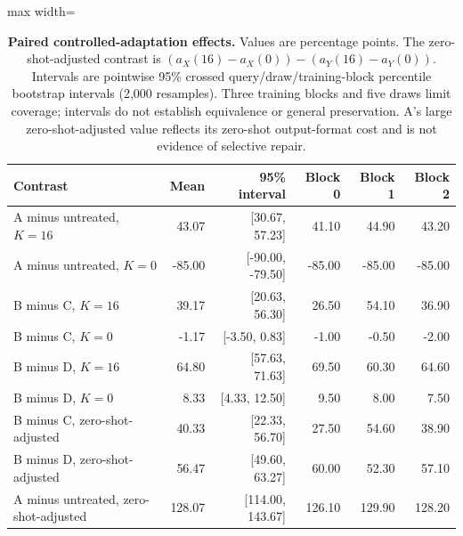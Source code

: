 \begin{table}[p]
\centering\color{blue}
\caption{\textbf{Paired controlled-adaptation effects.} Values are percentage points. The zero-shot-adjusted contrast is $(a_X(16)-a_X(0))-(a_Y(16)-a_Y(0))$. Intervals are pointwise 95\% crossed query/draw/training-block percentile bootstrap intervals (2,000 resamples). Three training blocks and five draws limit coverage; intervals do not establish equivalence or general preservation. A's large zero-shot-adjusted value reflects its zero-shot output-format cost and is not evidence of selective repair.}
\label{stab:final_training_contrasts}
\footnotesize
\begin{adjustbox}{max width=\textwidth}
\begin{tabular}{lrrrrr}
\toprule
Contrast & Mean & 95\% interval & Block 0 & Block 1 & Block 2 \\
\midrule
A minus untreated, $K=16$ & 43.07 & [30.67, 57.23] & 41.10 & 44.90 & 43.20 \\
A minus untreated, $K=0$ & -85.00 & [-90.00, -79.50] & -85.00 & -85.00 & -85.00 \\
B minus C, $K=16$ & 39.17 & [20.63, 56.30] & 26.50 & 54.10 & 36.90 \\
B minus C, $K=0$ & -1.17 & [-3.50, 0.83] & -1.00 & -0.50 & -2.00 \\
B minus D, $K=16$ & 64.80 & [57.63, 71.63] & 69.50 & 60.30 & 64.60 \\
B minus D, $K=0$ & 8.33 & [4.33, 12.50] & 9.50 & 8.00 & 7.50 \\
B minus C, zero-shot-adjusted & 40.33 & [22.33, 56.70] & 27.50 & 54.60 & 38.90 \\
B minus D, zero-shot-adjusted & 56.47 & [49.60, 63.27] & 60.00 & 52.30 & 57.10 \\
A minus untreated, zero-shot-adjusted & 128.07 & [114.00, 143.67] & 126.10 & 129.90 & 128.20 \\
\bottomrule
\end{tabular}
\end{adjustbox}
\end{table}

